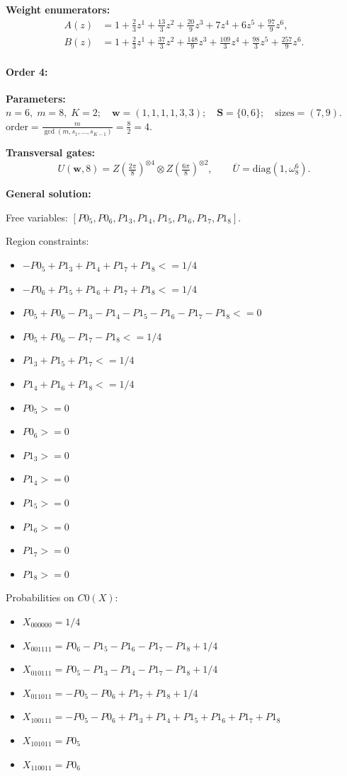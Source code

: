 \documentclass[11pt]{article}
\begin{document}
\noindent\textbf{Weight enumerators:}
\begin{align*}
A(z) &= 1 + \tfrac{2}{3}z^{1} + \tfrac{13}{3}z^{2} + \tfrac{20}{9}z^{3} + 7z^{4} + 6z^{5} + \tfrac{97}{9}z^{6},\\[2pt]
B(z) &= 1 + \tfrac{2}{3}z^{1} + \tfrac{37}{3}z^{2} + \tfrac{148}{9}z^{3} + \tfrac{109}{3}z^{4} + \tfrac{98}{3}z^{5} + \tfrac{257}{9}z^{6}.
\end{align*}

\paragraph{\textbf{Order 4:}}
\noindent\textbf{Parameters:} $n=6,\; m=8,\; K=2;\quad \mathbf w=(1, 1, 1, 1, 3, 3);\quad \mathbf S=\{0, 6\};\quad \text{sizes}=\left(7, 9\right).$ $\displaystyle \text{order}=\frac{m}{\gcd(m,s_1,\dots,s_{K-1})}=\frac{8}{2}=4.$

\noindent\textbf{Transversal gates:}
\[
    U(\mathbf w,8)=Z \left(\tfrac{2\pi}{8}\right)^{\otimes4} \otimes Z \left(\tfrac{6\pi}{8}\right)^{\otimes2},\qquad
    \overline U=\mathrm{diag}(1,\omega_{8}^{6}).
\]

\noindent\textbf{General solution:}

Free variables: $[P0_5, P0_6, P1_3, P1_4, P1_5, P1_6, P1_7, P1_8]$.

Region constraints:
\begin{itemize}
    \item $-P0_5 + P1_3 + P1_4 + P1_7 + P1_8 <= 1/4$
    \item $-P0_6 + P1_5 + P1_6 + P1_7 + P1_8 <= 1/4$
    \item $P0_5 + P0_6 - P1_3 - P1_4 - P1_5 - P1_6 - P1_7 - P1_8 <= 0$
    \item $P0_5 + P0_6 - P1_7 - P1_8 <= 1/4$
    \item $P1_3 + P1_5 + P1_7 <= 1/4$
    \item $P1_4 + P1_6 + P1_8 <= 1/4$
    \item $P0_5 >= 0$
    \item $P0_6 >= 0$
    \item $P1_3 >= 0$
    \item $P1_4 >= 0$
    \item $P1_5 >= 0$
    \item $P1_6 >= 0$
    \item $P1_7 >= 0$
    \item $P1_8 >= 0$
\end{itemize}

Probabilities on $C0 (X)$:
\begin{itemize}
    \item $X_{000000} = 1/4$
    \item $X_{001111} = P0_6 - P1_5 - P1_6 - P1_7 - P1_8 + 1/4$
    \item $X_{010111} = P0_5 - P1_3 - P1_4 - P1_7 - P1_8 + 1/4$
    \item $X_{011011} = -P0_5 - P0_6 + P1_7 + P1_8 + 1/4$
    \item $X_{100111} = -P0_5 - P0_6 + P1_3 + P1_4 + P1_5 + P1_6 + P1_7 + P1_8$
    \item $X_{101011} = P0_5$
    \item $X_{110011} = P0_6$
\end{itemize}
\end{document}
